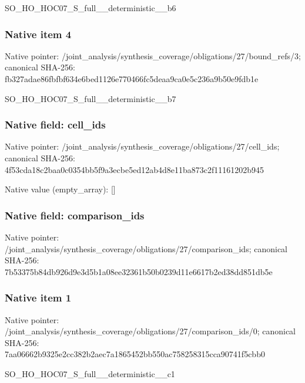 \documentclass[10pt,a4paper]{article}
\begin{document}
\begingroup\raggedright\sloppy SO\_\allowbreak{}HO\_\allowbreak{}HOC07\_\allowbreak{}S\_\allowbreak{}full\_\allowbreak{}\_\allowbreak{}deterministic\_\allowbreak{}\_\allowbreak{}b6\par\endgroup

\subsubsection{Native item 4}
Native pointer: /joint\_\allowbreak{}analysis/synthesis\_\allowbreak{}coverage/obligations/27/bound\_\allowbreak{}refs/3; canonical SHA-256: fb327adae86fbfbf634e6bed1126e770466fc5deaa9ca0e5c236a9b50e9fdb1e

\begingroup\raggedright\sloppy SO\_\allowbreak{}HO\_\allowbreak{}HOC07\_\allowbreak{}S\_\allowbreak{}full\_\allowbreak{}\_\allowbreak{}deterministic\_\allowbreak{}\_\allowbreak{}b7\par\endgroup

\subsubsection{Native field: cell\_\allowbreak{}ids}
Native pointer: /joint\_\allowbreak{}analysis/synthesis\_\allowbreak{}coverage/obligations/27/cell\_\allowbreak{}ids; canonical SHA-256: 4f53cda18c2baa0c0354bb5f9a3ecbe5ed12ab4d8e11ba873c2f11161202b945

Native value (empty\_\allowbreak{}array): []

\subsubsection{Native field: comparison\_\allowbreak{}ids}
Native pointer: /joint\_\allowbreak{}analysis/synthesis\_\allowbreak{}coverage/obligations/27/comparison\_\allowbreak{}ids; canonical SHA-256: 7b53375b84db926d9e3d5b1a08ee32361b50b0239d11e6617b2ed38dd851db5e

\subsubsection{Native item 1}
Native pointer: /joint\_\allowbreak{}analysis/synthesis\_\allowbreak{}coverage/obligations/27/comparison\_\allowbreak{}ids/0; canonical SHA-256: 7aa06662b9325e2cc382b2aec7a1865452bb550ac758258315cca90741f5cbb0

\begingroup\raggedright\sloppy SO\_\allowbreak{}HO\_\allowbreak{}HOC07\_\allowbreak{}S\_\allowbreak{}full\_\allowbreak{}\_\allowbreak{}deterministic\_\allowbreak{}\_\allowbreak{}c1\par\endgroup
\end{document}
